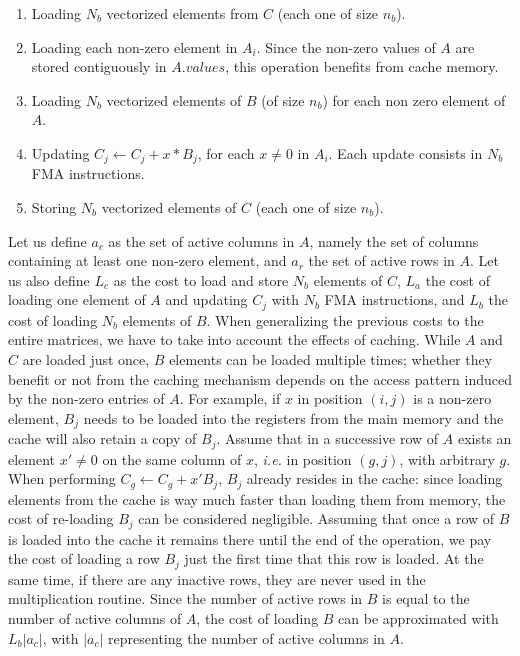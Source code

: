 \begin{enumerate}
	\item Loading $N_b$ vectorized elements from $C$ (each one of size $n_b$).
	\item Loading each non-zero element in $A_i$. Since the non-zero values of $A$ are stored contiguously in $A.values$, this operation benefits from cache memory.
	\item Loading $N_b$ vectorized elements of $B$ (of size $n_b$) for each non zero element of $A$.
	\item Updating $C_j \leftarrow C_j + x *B_j$, for each $x\neq0$ in $A_i$. Each update consists in $N_b$ FMA instructions. 
	\item Storing $N_b$ vectorized elements of $C$ (each one of size $n_b$).  


\end{enumerate}
Let us define $a_c$ as the set of active columns in $A$, namely the set of columns containing at least one non-zero element, and $a_r$ the set of active rows in $A$. Let us also define $L_c$ as the cost to load and store $N_b$ elements of $C$, $L_a$ the cost of loading one element of $A$ and updating $C_j$ with $N_b$ FMA instructions, and $L_b$ the cost of loading $N_b$ elements of $B$. 
When generalizing the previous costs to the entire matrices, we have to take into account the effects of caching. 
While $A$ and $C$ are loaded just once, $B$ elements can be loaded multiple times; whether they benefit or not from the caching mechanism depends on the access pattern induced by the non-zero entries of $A$.
For example, if $x$ in position $(i,j)$ is a non-zero element, $B_j$ needs to be loaded into the registers from the main memory and the cache will also retain a copy of $B_j$.
Assume that in a successive row of $A$ exists an element $x' \neq 0$ on the same column of $x$, \textit{i.e.} in position $(g, j)$, with arbitrary $g$. When performing $C_g \leftarrow C_g + x' B_j$,  $B_j$ already resides in the cache: since loading elements from the cache is way much faster than loading them from memory, the cost of re-loading $B_j$ can be considered negligible. 
Assuming that once a row of $B$ is loaded into the cache it remains there until the end of the operation, we pay the cost of loading a row $B_j$ just the first time that this row is loaded. At the same time, if there are any inactive rows, they are never used in the multiplication routine. Since the number of active rows in $B$ is equal to the number of active columns of $A$, the cost of loading $B$ can be approximated with $L_b |a_c|$, with $|a_c|$ representing the number of active columns in $A$.

